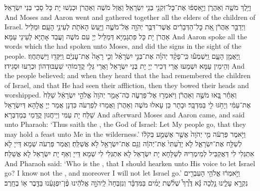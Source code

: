 {וַיֵּ֥לֶךְ מֹשֶׁ֖ה וְאַהֲרֹ֑ן וַיַּ֣אַסְפ֔וּ אֶת־כׇּל־זִקְנֵ֖י בְּנֵ֥י יִשְׂרָאֵֽל׃}
{וַאֲזַל מֹשֶׁה וְאַהֲרֹן וּכְנַשׁוּ יָת כָּל סָבֵי בְּנֵי יִשְׂרָאֵל׃}
{And Moses and Aaron went and gathered together all the elders of the children of Israel.}{}
{וַיְדַבֵּ֣ר אַהֲרֹ֔ן אֵ֚ת כׇּל־הַדְּבָרִ֔ים אֲשֶׁר־דִּבֶּ֥ר יְהֹוָ֖ה אֶל־מֹשֶׁ֑ה וַיַּ֥עַשׂ הָאֹתֹ֖ת לְעֵינֵ֥י הָעָֽם׃}
{וּמַלֵּיל אַהֲרֹן יָת כָּל פִּתְגָמַיָּא דְּמַלֵּיל יְיָ עִם מֹשֶׁה וַעֲבַד אָתַיָּא לְעֵינֵי עַמָּא׃}
{And Aaron spoke all the words which the \lord\space had spoken unto Moses, and did the signs in the sight of the people.}{}
{וַֽיַּאֲמֵ֖ן הָעָ֑ם וַֽיִּשְׁמְע֡וּ כִּֽי־פָקַ֨ד יְהֹוָ֜ה אֶת־בְּנֵ֣י יִשְׂרָאֵ֗ל וְכִ֤י רָאָה֙ אֶת־עׇנְיָ֔ם וַֽיִּקְּד֖וּ וַיִּֽשְׁתַּחֲוֽוּ׃}
{וְהֵימֵין עַמָּא וּשְׁמַעוּ אֲרֵי דְּכִיר יְיָ יָת בְּנֵי יִשְׂרָאֵל וַאֲרֵי גְּלֵי קֳדָמוֹהִי שִׁעְבּוּדְהוֹן וּכְרַעוּ וּסְגִידוּ׃}
{And the people believed; and when they heard that the \lord\space had remembered the children of Israel, and that He had seen their affliction, then they bowed their heads and worshipped.}{}
\newperek
{}%
{וְאַחַ֗ר בָּ֚אוּ מֹשֶׁ֣ה וְאַהֲרֹ֔ן וַיֹּאמְר֖וּ אֶל־פַּרְעֹ֑ה כֹּֽה־אָמַ֤ר יְהֹוָה֙ אֱלֹהֵ֣י יִשְׂרָאֵ֔ל שַׁלַּח֙ אֶת־עַמִּ֔י וְיָחֹ֥גּוּ לִ֖י בַּמִּדְבָּֽר׃
}
{וּבָתָר כֵּן עָאלוּ מֹשֶׁה וְאַהֲרֹן וַאֲמַרוּ לְפַרְעֹה כִּדְנָן אֲמַר יְיָ אֱלָהָא דְּיִשְׂרָאֵל שַׁלַּח יָת עַמִּי וְיֵיחֲגוּן קֳדָמַי בְּמַדְבְּרָא׃}
{And afterward Moses and Aaron came, and said unto Pharaoh: ‘Thus saith the \lord, the God of Israel: Let My people go, that they may hold a feast unto Me in the wilderness.’}{}
{וַיֹּ֣אמֶר פַּרְעֹ֔ה מִ֤י יְהֹוָה֙ אֲשֶׁ֣ר אֶשְׁמַ֣ע בְּקֹל֔וֹ לְשַׁלַּ֖ח אֶת־יִשְׂרָאֵ֑ל לֹ֤א יָדַ֙עְתִּי֙ אֶת־יְהֹוָ֔ה וְגַ֥ם אֶת־יִשְׂרָאֵ֖ל לֹ֥א אֲשַׁלֵּֽחַ׃}
{וַאֲמַר פַּרְעֹה שְׁמָא דַּייָ לָא אִתְגְּלִי לִי דַּאֲקַבֵּיל לְמֵימְרֵיהּ לְשַׁלָּחָא יָת יִשְׂרָאֵל לָא אִתְגְּלִי לִי שְׁמָא דַּייָ וְאַף יָת יִשְׂרָאֵל לָא אֲשַׁלַּח׃}
{And Pharaoh said: ‘Who is the \lord, that I should hearken unto His voice to let Israel go? I know not the \lord, and moreover I will not let Israel go.’}{}
{וַיֹּ֣אמְר֔וּ אֱלֹהֵ֥י הָעִבְרִ֖ים נִקְרָ֣א עָלֵ֑ינוּ נֵ֣לְכָה נָּ֡א דֶּ֩רֶךְ֩ שְׁלֹ֨שֶׁת יָמִ֜ים בַּמִּדְבָּ֗ר וְנִזְבְּחָה֙ לַֽיהֹוָ֣ה אֱלֹהֵ֔ינוּ פֶּ֨ן־יִפְגָּעֵ֔נוּ בַּדֶּ֖בֶר א֥וֹ בֶחָֽרֶב׃
}
